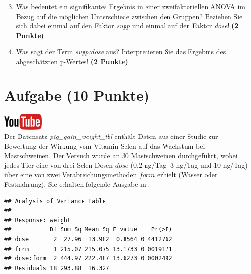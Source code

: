 \documentclass[a4paper, 10pt]{scrartcl}\usepackage[]{graphicx}\usepackage[]{xcolor}
\makeatletter
\newenvironment{kframe}{%
 \def\at@end@of@kframe{}%
 \ifinner\ifhmode%
  \def\at@end@of@kframe{\end{minipage}}%
  \begin{minipage}{\columnwidth}%
 \fi\fi%
 \def\FrameCommand##1{\hskip\@totalleftmargin \hskip-\fboxsep
 \colorbox{shadecolor}{##1}\hskip-\fboxsep
     \hskip-\linewidth \hskip-\@totalleftmargin \hskip\columnwidth}%
 \MakeFramed {\advance\hsize-\width
   \@totalleftmargin\z@ \linewidth\hsize
   \@setminipage}}%
 {\par\unskip\endMakeFramed%
 \at@end@of@kframe}
\newenvironment{knitrout}{}{} %
\makeatother
\begin{document}
\begin{enumerate}
  \setcounter{enumi}{2}
\item Was bedeutet ein signifikantes Ergebnis in einer zweifaktoriellen
  ANOVA im Bezug auf die m{\"o}glichen Unterschiede zwischen den Gruppen?
  Beziehen Sie sich dabei einmal auf den Faktor \textit{supp} und einmal
  auf den Faktor \textit{dose}! \textbf{(2 Punkte)}
\item Was sagt der Term \textit{supp:dose} aus? Interpretieren Sie das
  Ergebnis des abgesch{\"a}tzten p-Wertes! \textbf{(2 Punkte)}
\end{enumerate}
 
\clearpage

\section{Aufgabe \hfill (10 Punkte)}

\hfill\href{https://youtu.be/rWTyHXXlYjY}{\includegraphics[width =
  2cm]{img/youtube}}\\[1Ex]


Der Datensatz \textit{pig\_gain\_weight\_tbl} enth{\"a}lt Daten aus einer Studie zur Bewertung
der Wirkung vom Vitamin Selen auf das Wachstum bei Mastschweinen. Der
Versuch wurde an 30 Mastschweinen durchgef{\"u}hrt, wobei
jedes Tier eine von drei Selen-Dosen $dose$ ($0.2$ ng/Tag, $3$ ng/Tag und $10$ ng/Tag)
{\"u}ber eine von zwei Verabreichungsmethoden $form$ erhielt (Wasser oder
Festnahrung). Sie erhalten folgende Ausgabe in \Rlogo.

\begin{knitrout}
\color{fgcolor}\begin{kframe}
\begin{verbatim}
## Analysis of Variance Table
## 
## Response: weight
##           Df Sum Sq Mean Sq F value    Pr(>F)
## dose       2  27.96  13.982  0.8564 0.4412762
## form       1 215.07 215.075 13.1733 0.0019171
## dose:form  2 444.97 222.487 13.6273 0.0002492
## Residuals 18 293.88  16.327
\end{verbatim}
\end{kframe}
\end{knitrout}
\end{document}
